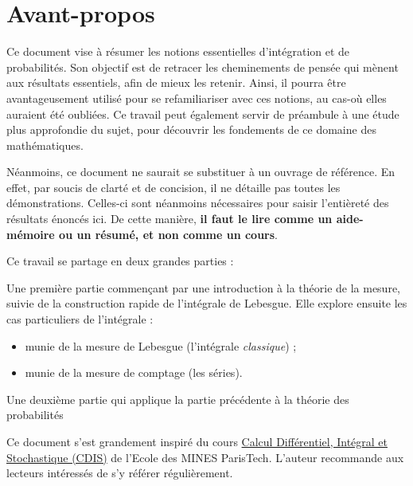 \documentclass[../integ-proba.tex]{subfiles}
\begin{document}
  \chapter*{Avant-propos}

  Ce document vise à résumer les notions essentielles d'intégration et de probabilités.
  Son objectif est de retracer les cheminements de pensée qui mènent aux résultats essentiels, afin de mieux les retenir.
  Ainsi, il pourra être avantageusement utilisé pour se refamiliariser avec ces notions, au cas-où elles auraient été oubliées.
  Ce travail peut également servir de préambule à une étude plus approfondie du sujet, pour découvrir les fondements de ce domaine des mathématiques.

  Néanmoins, ce document ne saurait se substituer à un ouvrage de référence.
  En effet, par soucis de clarté et de concision, il ne détaille pas toutes les démonstrations.
  Celles-ci sont néanmoins nécessaires pour saisir l'entièreté des résultats énoncés ici.
  De cette manière, \textbf{il faut le lire comme un aide-mémoire ou un résumé, et non comme un cours}.

  \bigskip

  Ce travail se partage en deux grandes parties :
  \begin{itemize}
    \itemb Une première partie commençant par une introduction à la théorie de la mesure, suivie de la construction rapide de l'intégrale de Lebesgue.
    Elle explore ensuite les cas particuliers de l'intégrale :
    \begin{itemize}
      \item munie de la mesure de Lebesgue (l'intégrale \textit{classique}) ;
      \item munie de la mesure de comptage (les séries).
    \end{itemize}
    \itemb Une deuxième partie qui applique la partie précédente à la théorie des probabilités
  \end{itemize}

  \bigskip

  Ce document s'est grandement inspiré du cours \href{https://github.com/boisgera/CDIS}{Calcul Différentiel, Intégral et Stochastique (CDIS)} de l'Ecole des MINES ParisTech.
  L'auteur recommande aux lecteurs intéressés de s'y référer régulièrement.
\end{document}
